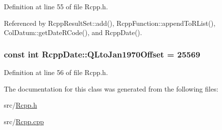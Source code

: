 Definition at line 55 of file Rcpp.h.

Referenced by RcppResultSet::add(), RcppFunction::appendToRList(), ColDatum::getDateRCode(), and RcppDate().\hypertarget{classRcppDate_06b285d4a04c5225a067e76d4fbfd2d4}{
\subsubsection[QLtoJan1970Offset]{\setlength{\rightskip}{0pt plus 5cm}const int {\bf RcppDate::QLtoJan1970Offset} = 25569}}
\label{classRcppDate_06b285d4a04c5225a067e76d4fbfd2d4}




Definition at line 56 of file Rcpp.h.

The documentation for this class was generated from the following files:\begin{CompactItemize}
\item 
src/\hyperlink{Rcpp_8h}{Rcpp.h}\item 
src/\hyperlink{Rcpp_8cpp}{Rcpp.cpp}\end{CompactItemize}
